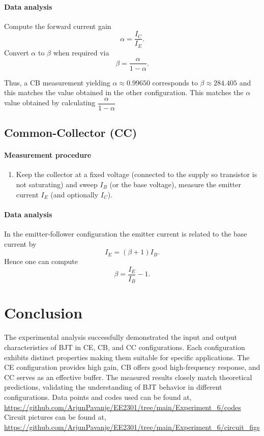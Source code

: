 \documentclass[12pt,a4paper]{article}
\begin{document}
\paragraph{Data analysis}
Compute the forward current gain
\begin{equation}
  \alpha = \frac{I_C}{I_E}.
\end{equation}
Convert $\alpha$ to $\beta$ when required via
\begin{equation}
  \beta = \frac{\alpha}{1-\alpha}.
\end{equation}

Thus, a CB measurement yielding $\alpha\approx 0.99650$ corresponds to $\beta\approx 284.405$ and this matches the value obtained in the other configuration. This matches the $\alpha$ value obtained by calculating $\dfrac{\alpha}{1-\alpha}$

\subsection{Common-Collector (CC)}
\paragraph{Measurement procedure}
\begin{enumerate}
  \item Keep the collector at a fixed voltage (connected to the supply so transistor is not saturating) and sweep $I_B$ (or the base voltage), measure the emitter current $I_E$ (and optionally $I_C$).
\end{enumerate}

\paragraph{Data analysis}
In the emitter-follower configuration the emitter current is related to the base current by
\begin{equation}
  I_E = (\beta+1)I_B.
\end{equation}
Hence one can compute
\begin{equation}
  \beta = \frac{I_E}{I_B} - 1.
\end{equation}

\section{Conclusion}

The experimental analysis successfully demonstrated the input and output characteristics of BJT in CE, CB, and CC configurations. Each configuration exhibits distinct properties making them suitable for specific applications. The CE configuration provides high gain, CB offers good high-frequency response, and CC serves as an effective buffer. The measured results closely match theoretical predictions, validating the understanding of BJT behavior in different configurations.
\newline \newline
Data points and codes used can be found at, \url{https://github.com/ArjunPavanje/EE2301/tree/main/Experiment_6/codes} \newline
Circuit pictures can be found at, \url{https://github.com/ArjunPavanje/EE2301/tree/main/Experiment_6/circuit_figs}
\end{document}
